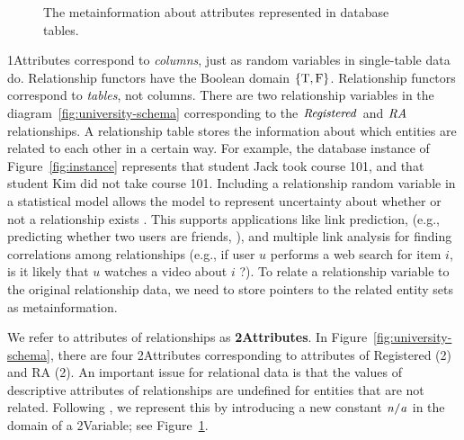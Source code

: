 \documentclass{acm_proc_article-sp}
\begin{document}
\begin{figure}[htbp] %
 \centering
{} 
\caption{The metainformation about attributes represented in database tables.  
}
 \label{fig:attributes}
\end{figure}

1Attributes correspond to {\em columns}, just as random variables in single-table data do. Relationship functors have the Boolean domain $\{\mathrm{T},\mathrm{F}\}$. Relationship functors correspond to {\em tables}, not columns. There are two relationship variables in the diagram~\ref{fig:university-schema} corresponding to the $\it{Registered}$ and $\it{RA}$ relationships. A relationship table stores the information about which entities are related to each other in a certain way. For example, the database instance of Figure~\ref{fig:instance} represents that student Jack took course 101, and that student Kim did not take course 101. Including a relationship random variable in a statistical model allows the model to represent uncertainty about whether or not a relationship exists \cite{linkGetoor2003,domingos}. This supports applications like link prediction, (e.g., predicting whether two users are friends, \cite{Liben-Nowell2007}), and multiple link analysis for finding correlations among relationships (e.g., if user $u$ performs a web search for item $i$, is it likely that $u$ watches a video about $i$ ?). 
%
To relate a relationship variable to the original relationship data, we need to store pointers to the related entity sets as metainformation. 

We refer to attributes of relationships as \textbf{2Attributes}. In Figure~\ref{fig:university-schema}, there are four 2Attributes corresponding to attributes of Registered (2) and RA (2). An important issue for relational data is that the values of descriptive attributes of relationships are undefined for entities that are not related. Following \cite{Russell2010}, we represent this by introducing a new constant $\it{n/a}$ in the domain of a 2Variable; see Figure~\ref{fig:attributes}.
\end{document}
